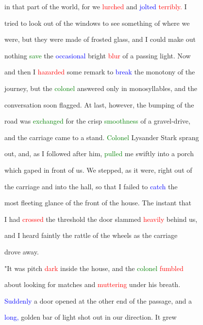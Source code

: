  in that part of the world, for we \textcolor{red}{lurched} and \textcolor{blue}{jolted} \textcolor{red}{terribly.} I

 tried to look out of the windows to see something of where we

 were, but they were made of frosted glass, and I could make out

 nothing \textcolor{green}{save} the \textcolor{blue}{occasional} bright \textcolor{red}{blur} of a passing light. Now

 and then I \textcolor{red}{hazarded} some remark to \textcolor{blue}{break} the monotony of the

 \textcolor{BurntOrange}{journey,} but the \textcolor{green}{colonel} answered only in monosyllables, and the

 conversation soon flagged. At last, however, the bumping of the

 road was \textcolor{green}{exchanged} for the \textcolor{BurntOrange}{crisp} \textcolor{green}{smoothness} of a gravel-drive,

 and the carriage came to a stand. \textcolor{green}{Colonel} Lysander \textcolor{BurntOrange}{Stark} sprang

 out, and, as I followed after him, \textcolor{green}{pulled} me swiftly into a porch

 which gaped in front of us. We stepped, as it were, right out of

 the carriage and into the hall, so that I failed to \textcolor{blue}{catch} the

 most fleeting glance of the front of the house. The instant that

 I had \textcolor{red}{crossed} the threshold the door \textcolor{BurntOrange}{slammed} \textcolor{red}{heavily} behind us,

 and I heard faintly the rattle of the wheels as the carriage

 drove away.



 "It was pitch \textcolor{red}{dark} inside the house, and the \textcolor{green}{colonel} \textcolor{red}{fumbled}

 about looking for matches and \textcolor{red}{muttering} under his breath.

 \textcolor{blue}{Suddenly} a door opened at the other end of the passage, and a

 \textcolor{blue}{long,} golden bar of light \textcolor{BurntOrange}{shot} out in our direction. It \textcolor{BurntOrange}{grew}

